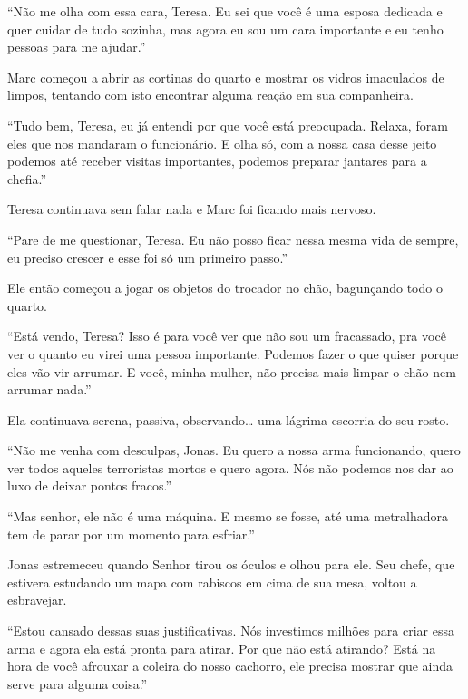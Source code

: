 ``Não me olha com essa cara, Teresa. Eu sei que você é uma esposa
dedicada e quer cuidar de tudo sozinha, mas agora eu sou um cara
importante e eu tenho pessoas para me ajudar.''

Marc começou a abrir as cortinas do quarto e mostrar os vidros
imaculados de limpos, tentando com isto encontrar alguma reação em sua
companheira.

``Tudo bem, Teresa, eu já entendi por que você está preocupada. Relaxa,
foram eles que nos mandaram o funcionário. E olha só, com a nossa casa
desse jeito podemos até receber visitas importantes, podemos preparar
jantares para a chefia.''

Teresa continuava sem falar nada e Marc foi ficando mais nervoso.

``Pare de me questionar, Teresa. Eu não posso ficar nessa mesma vida de
sempre, eu preciso crescer e esse foi só um primeiro passo.''

Ele então começou a jogar os objetos do trocador no chão, bagunçando
todo o quarto.

``Está vendo, Teresa? Isso é para você ver que não sou um fracassado,
pra você ver o quanto eu virei uma pessoa importante. Podemos fazer o
que quiser porque eles vão vir arrumar. E você, minha mulher, não
precisa mais limpar o chão nem arrumar nada.''

Ela continuava serena, passiva, observando\ldots{} uma lágrima
escorria do seu rosto.

\asterisc


``Não me venha com desculpas, Jonas. Eu quero a nossa arma funcionando,
quero ver todos aqueles terroristas mortos e quero agora. Nós não
podemos nos dar ao luxo de deixar pontos fracos.''

``Mas senhor, ele não é uma máquina. E mesmo se fosse, até uma
metralhadora tem de parar por um momento para esfriar.''

Jonas estremeceu quando Senhor  tirou os óculos e olhou para ele. Seu
chefe, que estivera estudando um mapa com rabiscos em cima de sua mesa,
voltou a esbravejar.

``Estou cansado dessas suas justificativas. Nós investimos milhões para
criar essa arma e agora ela está pronta para atirar. Por que não está
atirando? Está na hora de você afrouxar a coleira do nosso cachorro, ele
precisa mostrar que ainda serve para alguma coisa.''

